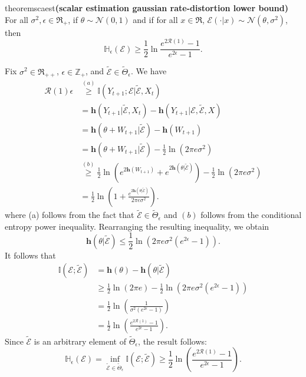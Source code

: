 \documentclass[twoside,11pt]{article}
\renewenvironment{proof}{\par\noindent{\bf Proof\ }}{\hfill\BlackBox\\[2mm]}
\newenvironment{proof}{\par\noindent{\bf Proof\ }}{\hfill\BlackBox\\[2mm]}
\def\environment{\mathcal{E}}
\def\proxy{\tilde{\environment}}
\def\proxyset{\tilde{\Theta}}
\def\regret{\mathcal{R}}
\def\normal{\mathcal{N}}
\def\ratedistortion{\H_\epsilon(\environment)}
\def\diffentropy{\bf h}
\def\H{\mathbb{H}}
\def\diffentropy{\mathbf{h}}
\def\I{\mathbb{I}}
\begin{document}
\begin{restatable}{theorem}{scaest}{\bf (scalar estimation gaussian rate-distortion lower bound)}
    \label{th:scalar-estimation-rate-distortion-lower}
    For all $\sigma^2, \epsilon \in \Re_+$, if $\theta \sim \normal(0,1)$ and if for all $x\in \Re$, $\environment(\cdot|x)\sim \mathcal{N}(\theta, \sigma^2)$, then
    $$\ratedistortion \geq \frac{1}{2}\ln \frac{e^{2\regret(1)}-1}{e^{2 \epsilon}-1}.$$
\end{restatable}
\begin{proof}
    Fix $\sigma^2 \in \Re_{++}$, $\epsilon \in \mathbb{Z}_+$, and $\proxy \in \proxyset_\epsilon$. We have
    \begin{align*}
    \regret(1) \epsilon
    &\overset{(a)}{\geq} \I(Y_{t+1};\environment|\proxy, X_t) \\
    &= \diffentropy(Y_{t+1}|\proxy, X_t) - \diffentropy(Y_{t+1}|\environment,\proxy,X) \\
    &= \diffentropy(\theta + W_{t+1}|\proxy) - \diffentropy(W_{t+1}) \\
    &= \diffentropy(\theta+W_{t+1}|\proxy) - \frac{1}{2}\ln\left(2\pi e\sigma^2\right) \\
    &\overset{(b)}{\geq} \frac{1}{2}\ln\left(e^{2\diffentropy(W_{t+1})}+e^{2\diffentropy(\theta|\proxy)}\right) - \frac{1}{2}\ln\left(2\pi e\sigma^2\right)\\
    & = \frac{1}{2}\ln\left(1 + \frac{e^{2\diffentropy(\theta|\proxy)}}{2\pi e\sigma^2}\right).
    \end{align*}
    where (a) follows from the fact that $\proxy \in \proxyset_\epsilon$ and $(b)$ follows from the conditional entropy power inequality.  Rearranging the resulting inequality, we obtain
    \begin{equation}\label{eq:diff_ent_bound}
    \diffentropy(\theta|\proxy) \leq \frac{1}{2}\ln\left(2\pi e\sigma^2\left(e^{2\epsilon}-1\right)\right).  
    \end{equation}
    It follows that
    \begin{align*}
    \I(\environment;\proxy)
    &= \diffentropy(\theta)-\diffentropy(\theta|\proxy)\\
    &\geq \frac{1}{2}\ln\left(2\pi e\right) - \frac{1}{2}\ln\left(2\pi e\sigma^2\left(e^{2\epsilon} -1\right)\right) \\
    &= \frac{1}{2}\ln\left(\frac{1}{\sigma^2\left(e^{2\epsilon}-1\right)}\right)\\
    &= \frac{1}{2}\ln\left(\frac{e^{2\regret(1)}-1}{e^{2\epsilon}-1}\right).
    \end{align*}
    Since $\proxy$ is an arbitrary element of $\proxyset_\epsilon$, the result follows:
    $$\H_\epsilon(\environment) = \inf_{\proxy \in \proxyset_\epsilon} \I(\environment; \proxy) \geq \frac{1}{2}\ln\left(\frac{e^{2\regret(1)}-1}{e^{2\epsilon}-1}\right).$$
\end{proof}
\end{document}
